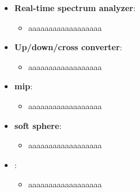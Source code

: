 
\begin{itemize}
	\item \textbf{Real-time spectrum analyzer}:
	      \begin{itemize}
		      \item aaaaaaaaaaaaaaaaaa
	      \end{itemize}
	\item \textbf{Up/down/cross converter}:
	      \begin{itemize}
		      \item aaaaaaaaaaaaaaaaaa
	      \end{itemize}
	\item \textbf{mip}:
	      \begin{itemize}
		      \item aaaaaaaaaaaaaaaaaa
	      \end{itemize}
	\item \textbf{soft sphere}:
	      \begin{itemize}
		      \item aaaaaaaaaaaaaaaaaa
	      \end{itemize}
	\item \textbf{}:
	      \begin{itemize}
		      \item aaaaaaaaaaaaaaaaaa
	      \end{itemize}





\end{itemize}